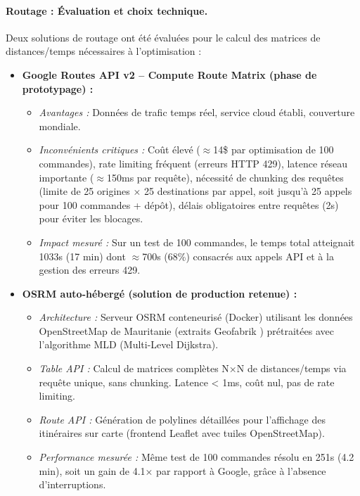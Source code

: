 \documentclass[12pt,a4paper]{report}
\begin{document}
\paragraph{Routage : Évaluation et choix technique.}
Deux solutions de routage ont été évaluées pour le calcul des matrices de distances/temps nécessaires à l'optimisation :

\begin{itemize}[leftmargin=2.2em]
  \item \textbf{Google Routes API v2 -- Compute Route Matrix (phase de prototypage) :} \cite{google_routes_matrix}
  \begin{itemize}
    \item \textit{Avantages :} Données de trafic temps réel, service cloud établi, couverture mondiale.
    \item \textit{Inconvénients critiques :} Coût élevé ($\approx$14\$ par optimisation de 100 commandes), rate limiting fréquent (erreurs HTTP 429), latence réseau importante ($\approx$150ms par requête), nécessité de chunking des requêtes (limite de 25 origines × 25 destinations par appel, soit jusqu'à 25 appels pour 100 commandes + dépôt), délais obligatoires entre requêtes (2s) pour éviter les blocages.
    \item \textit{Impact mesuré :} Sur un test de 100 commandes, le temps total atteignait 1033s (17 min) dont $\approx$700s (68\%) consacrés aux appels API et à la gestion des erreurs 429.
  \end{itemize}

  \item \textbf{OSRM auto-hébergé (solution de production retenue) :} \cite{osrm}
  \begin{itemize}
    \item \textit{Architecture :} Serveur OSRM conteneurisé (Docker) utilisant les données OpenStreetMap \cite{openstreetmap} de Mauritanie (extraits Geofabrik \cite{geofabrik}) prétraitées avec l'algorithme MLD (Multi-Level Dijkstra).
    \item \textit{Table API :} Calcul de matrices complètes N×N de distances/temps via requête unique, sans chunking. Latence < 1ms, coût nul, pas de rate limiting.
    \item \textit{Route API :} Génération de polylines détaillées pour l'affichage des itinéraires sur carte (frontend Leaflet avec tuiles OpenStreetMap).
    \item \textit{Performance mesurée :} Même test de 100 commandes résolu en 251s (4.2 min), soit un gain de 4.1× par rapport à Google, grâce à l'absence d'interruptions.
  \end{itemize}
\end{itemize}
\end{document}
